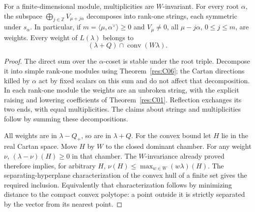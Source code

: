\begin{proposition}
\label{res:G07}
For a finite-dimensional module, multiplicities are \(W\)-invariant.
For every root \(\alpha\), the subspace
\(\bigoplus_{j\in\mathbb Z}V_{\mu+j\alpha}\) decomposes into rank-one
strings, each symmetric under \(s_\alpha\).
In particular, if \(m=\langle\mu,\alpha^\vee\rangle\geq0\)
and \(V_\mu\ne0\), all \(\mu-j\alpha\), \(0\leq j\leq m\),
are weights. Every weight of \(L(\lambda)\) belongs to
\[
 (\lambda+Q)\cap\operatorname{conv}(W\lambda).
\]
\end{proposition}
\begin{proof}
The direct sum over the \(\alpha\)-coset is stable under the
root triple. Decompose it into simple rank-one modules using
Theorem~\ref{res:C06}; the Cartan directions killed by \(\alpha\)
act by fixed scalars on this sum and do not affect that
decomposition. In each rank-one module the weights are an unbroken
string, with the explicit raising and lowering coefficients of
Theorem~\ref{res:C01}. Reflection exchanges its two ends, with
equal multiplicities. The claims about strings and multiplicities
follow by summing these decompositions.

All weights are in \(\lambda-Q_+\), so are in \(\lambda+Q\).
For the convex bound let \(H\) lie in the real Cartan space.
Move \(H\) by \(W\) to the closed dominant chamber. For any weight
\(\nu\), \((\lambda-\nu)(H)\geq0\) in that chamber.
The \(W\)-invariance already proved therefore implies, for arbitrary
\(H\),
\(\nu(H)\leq\max_{w\in W}(w\lambda)(H)\).
The separating-hyperplane characterization of the convex hull of
a finite set gives the required inclusion. Equivalently that
characterization follows by minimizing distance to the compact
convex polytope: a point outside it is strictly separated by the
vector from its nearest point.
\end{proof}

